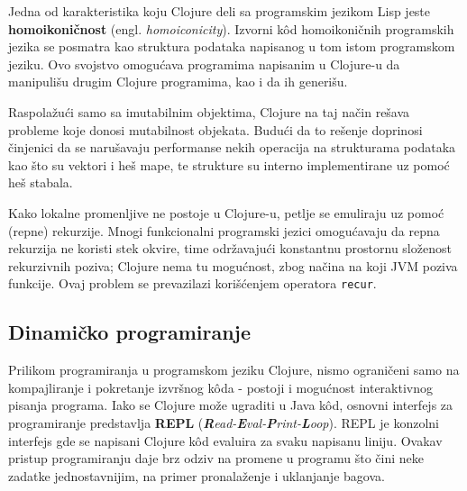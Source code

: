 Jedna od karakteristika koju Clojure deli sa programskim jezikom Lisp jeste \textbf{homoikoničnost} (engl. \textit{homoiconicity}). Izvorni kôd homoikoničnih programskih jezika se posmatra kao struktura podataka napisanog u tom istom programskom jeziku. Ovo svojstvo omogućava programima napisanim u Clojure-u da manipulišu drugim Clojure programima, kao i da ih generišu.

Raspolažući samo sa imutabilnim objektima, Clojure na taj način rešava probleme koje donosi mutabilnost objekata. Budući da to rešenje doprinosi činjenici da se narušavaju performanse nekih operacija na strukturama podataka kao što su vektori i heš mape, te strukture su interno implementirane uz pomoć heš stabala.

Kako lokalne promenljive ne postoje u Clojure-u, petlje se emuliraju uz pomoć (repne) rekurzije. Mnogi funkcionalni programski jezici omogućavaju da repna rekurzija ne koristi stek okvire, time održavajući konstantnu prostornu složenost rekurzivnih poziva; Clojure nema tu mogućnost, zbog načina na koji JVM poziva funkcije. Ovaj problem se prevazilazi korišćenjem operatora \texttt{recur}\cite{livingclojure}.

\subsection{Dinamičko programiranje}
\label{subsec:dinamickoprogramiranje}

Prilikom programiranja u programskom jeziku Clojure, nismo ograničeni samo na kompajliranje i pokretanje izvršnog kôda - postoji i mogućnost interaktivnog pisanja programa.
Iako se Clojure može ugraditi u Java kôd, osnovni interfejs za programiranje predstavlja \textbf{REPL} (\textit{\textbf{R}ead-\textbf{E}val-\textbf{P}rint-\textbf{L}oop}). REPL je konzolni interfejs gde se napisani Clojure kôd evaluira za svaku napisanu liniju. Ovakav pristup programiranju daje brz odziv na promene u programu što čini neke zadatke jednostavnijim, na primer pronalaženje i uklanjanje bagova. 
